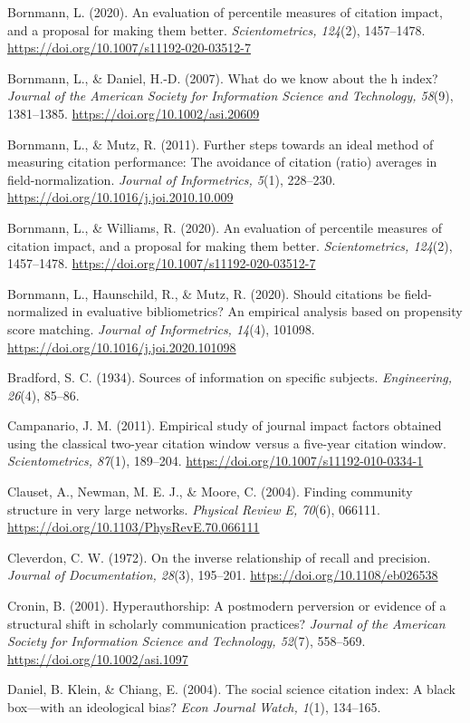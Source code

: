 \documentclass[
  letterpaper,
]{scrreprt}
\begin{document}
Bornmann, L. (2020). An evaluation of percentile measures of citation
impact, and a proposal for making them better. \emph{Scientometrics,
124}(2), 1457--1478. \url{https://doi.org/10.1007/s11192-020-03512-7}

Bornmann, L., \& Daniel, H.-D. (2007). What do we know about the h
index? \emph{Journal of the American Society for Information Science and
Technology, 58}(9), 1381--1385. \url{https://doi.org/10.1002/asi.20609}

Bornmann, L., \& Mutz, R. (2011). Further steps towards an ideal method
of measuring citation performance: The avoidance of citation (ratio)
averages in field-normalization. \emph{Journal of Informetrics, 5}(1),
228--230. \url{https://doi.org/10.1016/j.joi.2010.10.009}

Bornmann, L., \& Williams, R. (2020). An evaluation of percentile
measures of citation impact, and a proposal for making them better.
\emph{Scientometrics, 124}(2), 1457--1478.
\url{https://doi.org/10.1007/s11192-020-03512-7}

Bornmann, L., Haunschild, R., \& Mutz, R. (2020). Should citations be
field-normalized in evaluative bibliometrics? An empirical analysis
based on propensity score matching. \emph{Journal of Informetrics,
14}(4), 101098. \url{https://doi.org/10.1016/j.joi.2020.101098}

Bradford, S. C. (1934). Sources of information on specific subjects.
\emph{Engineering, 26}(4), 85--86.

Campanario, J. M. (2011). Empirical study of journal impact factors
obtained using the classical two-year citation window versus a five-year
citation window. \emph{Scientometrics, 87}(1), 189--204.
\url{https://doi.org/10.1007/s11192-010-0334-1}

Clauset, A., Newman, M. E. J., \& Moore, C. (2004). Finding community
structure in very large networks. \emph{Physical Review E, 70}(6),
066111. \url{https://doi.org/10.1103/PhysRevE.70.066111}

Cleverdon, C. W. (1972). On the inverse relationship of recall and
precision. \emph{Journal of Documentation, 28}(3), 195--201.
\url{https://doi.org/10.1108/eb026538}

Cronin, B. (2001). Hyperauthorship: A postmodern perversion or evidence
of a structural shift in scholarly communication practices?
\emph{Journal of the American Society for Information Science and
Technology, 52}(7), 558--569. \url{https://doi.org/10.1002/asi.1097}

Daniel, B. Klein, \& Chiang, E. (2004). The social science citation
index: A black box---with an ideological bias? \emph{Econ Journal Watch,
1}(1), 134--165.
\end{document}
